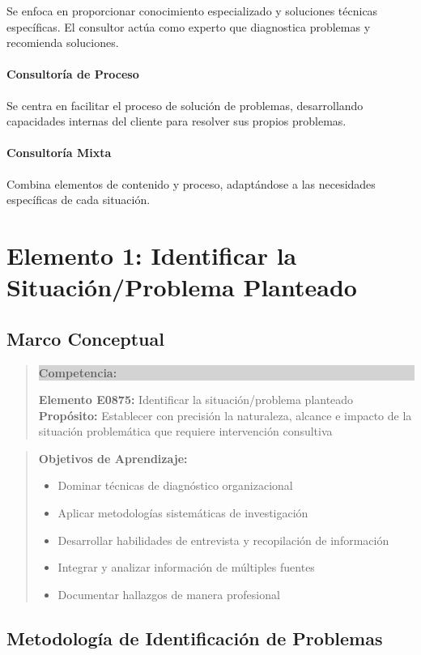 \documentclass[12pt,letterpaper,oneside]{book}
\newenvironment{objetivos}
{\begin{quote}\color{textgray}\textbf{Objetivos de Aprendizaje:}\begin{itemize}}
{\end{itemize}\end{quote}}
\newenvironment{competencia}
{\begin{quote}\colorbox{lightgray}{\parbox{\dimexpr\linewidth-2\fboxsep}{\textbf{Competencia:}\ }}}
{\end{quote}}
\begin{document}
Se enfoca en proporcionar conocimiento especializado y soluciones técnicas específicas. El consultor actúa como experto que diagnostica problemas y recomienda soluciones.

\subsubsection{Consultoría de Proceso}

Se centra en facilitar el proceso de solución de problemas, desarrollando capacidades internas del cliente para resolver sus propios problemas.

\subsubsection{Consultoría Mixta}

Combina elementos de contenido y proceso, adaptándose a las necesidades específicas de cada situación.

\chapter{Elemento 1: Identificar la Situación/Problema Planteado}

\section{Marco Conceptual}

\begin{competencia}
\textbf{Elemento E0875:} Identificar la situación/problema planteado\\
\textbf{Propósito:} Establecer con precisión la naturaleza, alcance e impacto de la situación problemática que requiere intervención consultiva
\end{competencia}

\begin{objetivos}
\item Dominar técnicas de diagnóstico organizacional
\item Aplicar metodologías sistemáticas de investigación
\item Desarrollar habilidades de entrevista y recopilación de información
\item Integrar y analizar información de múltiples fuentes
\item Documentar hallazgos de manera profesional
\end{objetivos}

\section{Metodología de Identificación de Problemas}
\end{document}
